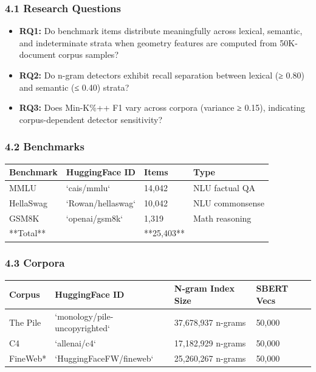 
\subsubsection{4.1 Research Questions}

\begin{itemize}
\item \textbf{RQ1:} Do benchmark items distribute meaningfully across lexical, semantic, and indeterminate strata when geometry features are computed from 50K-document corpus samples?
\item \textbf{RQ2:} Do n-gram detectors exhibit recall separation between lexical (≥ 0.80) and semantic (≤ 0.40) strata?
\item \textbf{RQ3:} Does Min-K\%++ F1 vary across corpora (variance ≥ 0.15), indicating corpus-dependent detector sensitivity?
\end{itemize}

\subsubsection{4.2 Benchmarks}

\begin{table}[htbp]
\centering
\begin{tabular}{llll}
\toprule
Benchmark & HuggingFace ID & Items & Type \\
\midrule
MMLU & `cais/mmlu` & 14,042 & NLU factual QA \\
HellaSwag & `Rowan/hellaswag` & 10,042 & NLU commonsense \\
GSM8K & `openai/gsm8k` & 1,319 & Math reasoning \\
**Total** &  & **25,403** &  \\
\bottomrule
\end{tabular}
\end{table}

\subsubsection{4.3 Corpora}

\begin{table}[htbp]
\centering
\begin{tabular}{llll}
\toprule
Corpus & HuggingFace ID & N-gram Index Size & SBERT Vecs \\
\midrule
The Pile & `monology/pile-uncopyrighted` & 37,678,937 n-grams & 50,000 \\
C4 & `allenai/c4` & 17,182,929 n-grams & 50,000 \\
FineWeb* & `HuggingFaceFW/fineweb` & 25,260,267 n-grams & 50,000 \\
\bottomrule
\end{tabular}
\end{table}

